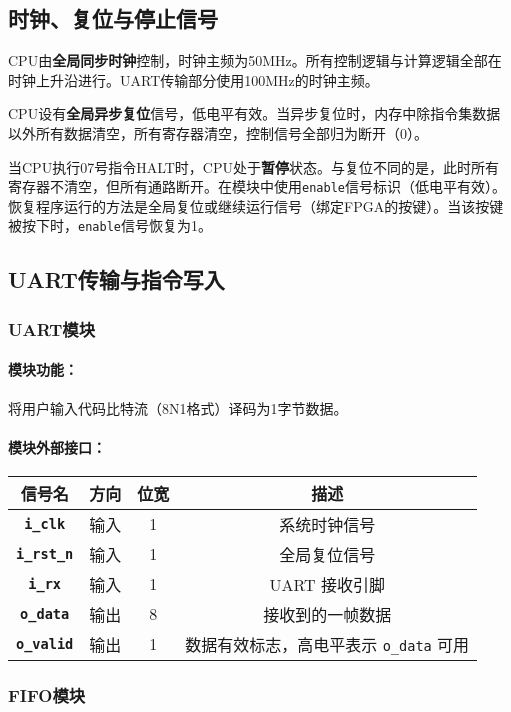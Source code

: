 \documentclass[lang=cn,a4paper,newtx]{elegantpaper}
\begin{document}
\subsection{时钟、复位与停止信号}
CPU由\textbf{全局同步时钟}控制，时钟主频为50MHz。所有控制逻辑与计算逻辑全部在时钟上升沿进行。UART传输部分使用100MHz的时钟主频。

CPU设有\textbf{全局异步复位}信号，低电平有效。当异步复位时，内存中除指令集数据以外所有数据清空，所有寄存器清空，控制信号全部归为断开（0）。

当CPU执行07号指令HALT时，CPU处于\textbf{暂停}状态。与复位不同的是，此时所有寄存器不清空，但所有通路断开。在模块中使用\texttt{enable}信号标识（低电平有效）。恢复程序运行的方法是全局复位或继续运行信号（绑定FPGA的按键）。当该按键被按下时，\texttt{enable}信号恢复为1。
\subsection{UART传输与指令写入}
\subsubsection{UART模块}
\paragraph{模块功能：}
将用户输入代码比特流（8N1格式）译码为1字节数据。
\paragraph{模块外部接口：}

\begin{longtable}{>{\bfseries}c c c c}
  \toprule
  信号名 & 方向 & 位宽 & 描述 \\
  \midrule
  \endhead
  
  \texttt{i\_clk}   & 输入  & 1      & 系统时钟信号 \\
  \texttt{i\_rst\_n} & 输入  & 1      & 全局复位信号 \\
  \texttt{i\_rx}    & 输入  & 1      & UART 接收引脚 \\
  \texttt{o\_data}  & 输出  & 8    & 接收到的一帧数据 \\
  \texttt{o\_valid} & 输出  & 1      & 数据有效标志，高电平表示 \texttt{o\_data} 可用 \\
  \bottomrule
  \end{longtable}

\subsubsection{FIFO模块}
\end{document}
